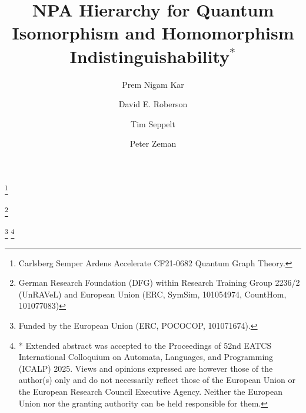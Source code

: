 \documentclass[a4paper,onecolumn,11pt,accepted=2026-01-06]{quantumarticle}
\theoremstyle{plain}
\theoremstyle{remark}
\theoremstyle{definition}
\begin{document}
\title{NPA Hierarchy for Quantum Isomorphism and\texorpdfstring{\newline}{ } Homomorphism Indistinguishability$^{*}$}
\author{Prem Nigam Kar}
\thanks{Carlsberg Semper Ardens Accelerate CF21-0682 Quantum Graph Theory.}
\author{David E. Roberson}
\author{Tim Seppelt}
\thanks{German Research Foundation (DFG) within Research Training Group 2236/2 (UnRAVeL) and European Union (ERC, SymSim, 101054974, CountHom, 101077083)}
\author{Peter Zeman}
\thanks{Funded by the European Union (ERC, POCOCOP, 101071674).}
\thanks{\texorpdfstring{\newline}{ }\texorpdfstring{\newline}{ }* Extended abstract was accepted to the Proceedings of 52nd EATCS International Colloquium on Automata, Languages, and Programming (ICALP) 2025. Views and opinions expressed are however those of the author(s) only and do not necessarily reflect those of the European Union or the European Research Council Executive Agency. Neither the European Union nor the granting authority can be held responsible for them.}

\maketitle
\end{document}
